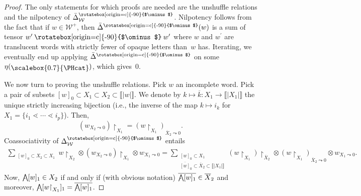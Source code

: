 \documentclass[pdftex]{sigma}
\newcommand\overt{\mathbin{\text{\rotatebox[origin=c]{-90}{$\ominus$}}}}
\newcommand{\interval}[1]{\llbracket #1 \rrbracket}
\renewcommand{\restriction}[2]{{#1\mathbin{\upharpoonright}_{#2}}}
\newcommand{\translucidation}[2]{{{#1}_{#2\leadsto0}}}
\newcommand{\stdl}{\lessdot}
\newcommand{\bigwedgedot}{{\mathop{\bigwedge\hspace{-7.8pt}\raisebox{-1pt}[0pt][0pt]{$\cdot$}\hspace{3pt}}\nolimits}}
\newcommand\IWc{\mathcal{W}}
\newcommand{\vcp}{\Delta^{\overt}}
\newcommand\vcpS{\vcp_{\IWc}}
\newcommand{\Singleton}{\raisebox{-2pt}{\scalebox{0.7}{\PHcat}}}
\numberwithin{equation}{section}
\begin{document}
\begin{proof}The only statements for which proofs are needed are the unshuffle relations and the nilpotency of $\bar{\Delta}^{\overt}_{\mathcal{W}}$. Nilpotency follows from the fact that if $w\in \mathcal{W}^+$, then $\bar{\Delta}^{\overt}(w)$ is a sum of tensor $w^{\prime}\overt w^{\prime}$ where $w$ and $w^{\prime}$ are translucent words with strictly fewer of opaque letters than~$w$ has. Iterating, we eventually end up applying $\bar{\Delta}^{\overt}$ on some $\eta(\Singleton)$, which gives~$0$.

We now turn to proving the unshuffle relations.
Pick $w$ an incomplete word. Pick a pair of subsets $[w]_0 \subset X_1 \subset X_2 \subset \interval{|w|}$. We denote by $k\mapsto \overline k\colon X_1 \to \interval{|X_1|}$ the unique strictly increasing bijection (i.e., the inverse of the map $k\mapsto i_k$ for $X_1=\{i_1\stdl\cdots \stdl i_p\}$). Then,
\[
\restriction{(\translucidation{w}{X_2})}{X_1} = \translucidation{(\restriction{w}{X_1})}{\overline{X}_2}.
\]
Coassociativity of $\vcpS$ entails
\begin{gather*}
\sum_{\substack{[w]_0 \subset X_2 \subset X_1}}\!\!\!\!\restriction{w}{X_2} \otimes \restriction{(\translucidation{w}{X_2})}{X_1} \otimes \translucidation{w}{X_1} = \sum_{\substack{[w]_0 \subset X_1 \\ \overline{[w]}_0\subset\overline{X}_2 \subset \interval{|X_1|}}} \!\!\!\!\restriction{(\restriction{w}{X_1})}{\overline{X}_2}\otimes \translucidation{(\restriction{w}{{X}_1})}{\overline{X}_2}\otimes\translucidation{w}{X_1}.
\end{gather*}
Now, $\bigwedgedot [w]_1 \in X_2$ if and only if (with obvious notation) $\overline{\bigwedgedot {[w]_1}} \in \overline{X}_2$ and moreover, $\bigwedgedot [\restriction{w}{X_1}]_1 = \overline{\bigwedgedot {[w]_1}}$.


\end{proof}
\end{document}
